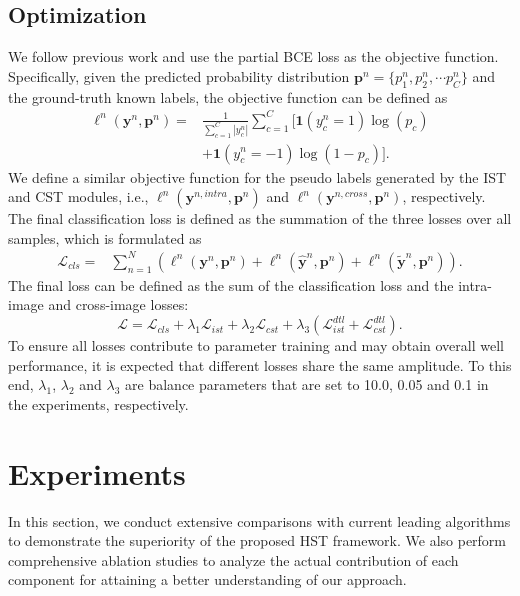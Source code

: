 \subsection{Optimization}
We follow previous work and use the partial BCE loss as the objective function. Specifically, given the predicted probability distribution $\textbf{p}^n=\{p^n_1, p^n_2, \cdots p^n_C\}$ and the ground-truth known labels, the objective function can be defined as
\begin{equation}
\begin{aligned}
\ell^{n}(\textbf{y}^n, \textbf{p}^n)=&\frac{1}{\sum_{c=1}^C|y^n_c|}\sum_{c=1}^C[\textbf{1}(y^n_c=1)\log(p_c) \\
&+\textbf{1}(y^n_c=-1)\log(1-p_c)].
\label{eq:pbce}
\end{aligned}
\end{equation}
We define a similar objective function for the pseudo labels generated by the IST and CST modules, i.e., $\ell^{n}(\textbf{y}^{n, intra}, \textbf{p}^n)$ and $\ell^{n}(\textbf{y}^{n, cross}, \textbf{p}^n)$, respectively. The final classification loss is defined as the summation of the three losses over all samples, which is formulated as
\begin{equation}
\begin{aligned}
\mathcal{L}_{cls}=&\sum_{n=1}^N(\ell^{n}(\textbf{y}^n, \textbf{p}^n) + \ell^{n}(\hat{\textbf{y}}^{n}, \textbf{p}^n) + \ell^{n}(\tilde{\textbf{y}}^{n}, \textbf{p}^n)).
\end{aligned}
\end{equation}
The final loss can be defined as the sum of the classification loss and the intra-image and cross-image losses:
\begin{equation}
\mathcal{L}=\mathcal{L}_{cls}+\lambda_{1}\mathcal{L}_{ist}+\lambda_{2}\mathcal{L}_{cst} + \lambda_{3}(\mathcal{L}_{ist}^{dtl} + \mathcal{L}_{cst}^{dtl}).
\label{eq:total-loss}
\end{equation}
To ensure all losses contribute to parameter training and may obtain overall well performance, it is expected that different losses share the same amplitude. To this end, $\lambda_{1}$, $\lambda_{2}$ and $\lambda_{3}$ are balance parameters that are set to 10.0, 0.05 and 0.1 in the experiments, respectively.

\section{Experiments}
\label{sec:exp}
In this section, we conduct extensive comparisons with current leading algorithms to demonstrate the superiority of the proposed HST framework. We also perform comprehensive ablation studies to analyze the actual contribution of each component for attaining a better understanding of our approach.

